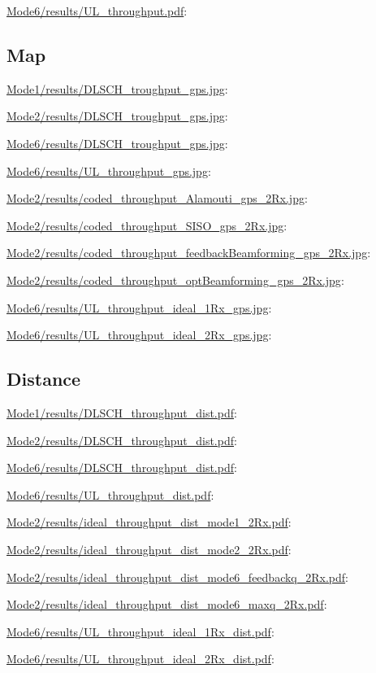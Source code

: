 \documentclass[a4paper,10pt]{article}
\newcommand{\printfile}[2][]{
 \begin{minipage}{8cm}
  \centering
  \url{#2}: #1

 \end{minipage}
}
\begin{document}
\printfile{Mode6/results/UL_throughput.pdf}


\subsection{Map}

\printfile{Mode1/results/DLSCH_troughput_gps.jpg}
\printfile{Mode2/results/DLSCH_troughput_gps.jpg}

\printfile{Mode6/results/DLSCH_troughput_gps.jpg}
\printfile{Mode6/results/UL_throughput_gps.jpg}

\printfile{Mode2/results/coded_throughput_Alamouti_gps_2Rx.jpg}
\printfile{Mode2/results/coded_throughput_SISO_gps_2Rx.jpg}

\printfile{Mode2/results/coded_throughput_feedbackBeamforming_gps_2Rx.jpg}
\printfile{Mode2/results/coded_throughput_optBeamforming_gps_2Rx.jpg}

\printfile{Mode6/results/UL_throughput_ideal_1Rx_gps.jpg}
\printfile{Mode6/results/UL_throughput_ideal_2Rx_gps.jpg}

\subsection{Distance}

\printfile{Mode1/results/DLSCH_throughput_dist.pdf}
\printfile{Mode2/results/DLSCH_throughput_dist.pdf}

\printfile{Mode6/results/DLSCH_throughput_dist.pdf}
\printfile{Mode6/results/UL_throughput_dist.pdf}


\printfile{Mode2/results/ideal_throughput_dist_mode1_2Rx.pdf}
%
\printfile{Mode2/results/ideal_throughput_dist_mode2_2Rx.pdf}

\printfile{Mode2/results/ideal_throughput_dist_mode6_feedbackq_2Rx.pdf}
%
\printfile{Mode2/results/ideal_throughput_dist_mode6_maxq_2Rx.pdf}

\printfile{Mode6/results/UL_throughput_ideal_1Rx_dist.pdf}
\printfile{Mode6/results/UL_throughput_ideal_2Rx_dist.pdf}
\end{document}
